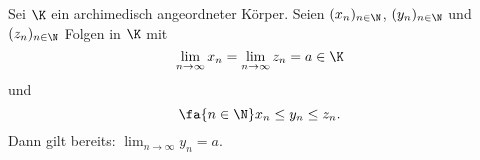 \begin{exercise}
  \label{ex:squeeze-lemma}
  Sei $\K$ ein archimedisch angeordneter Körper. Seien $(x_n)_{n \in \N}$,
  $(y_n)_{n \in \N}$ und $(z_n)_{n \in \N}$ Folgen in $\K$ mit
  \[
    \lim_{n \to \infty} x_n = \lim_{n \to \infty} z_n = a \in \K
  \]
  und
  \[
    \fa{n \in \N} x_n \leq y_n \leq z_n.
  \]
  Dann gilt bereits: $\lim_{n \to \infty} y_n = a$.
\end{exercise}
